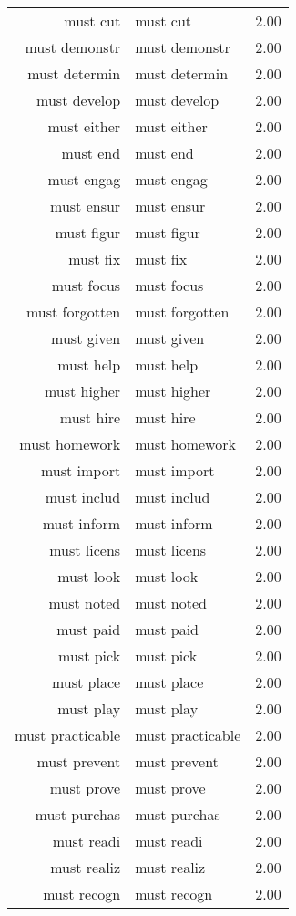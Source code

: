 \begin{table}[ht]
\begin{tabular}{rlr}
  must cut & must cut & 2.00 \\ 
  must demonstr & must demonstr & 2.00 \\ 
  must determin & must determin & 2.00 \\ 
  must develop & must develop & 2.00 \\ 
  must either & must either & 2.00 \\ 
  must end & must end & 2.00 \\ 
  must engag & must engag & 2.00 \\ 
  must ensur & must ensur & 2.00 \\ 
  must figur & must figur & 2.00 \\ 
  must fix & must fix & 2.00 \\ 
  must focus & must focus & 2.00 \\ 
  must forgotten & must forgotten & 2.00 \\ 
  must given & must given & 2.00 \\ 
  must help & must help & 2.00 \\ 
  must higher & must higher & 2.00 \\ 
  must hire & must hire & 2.00 \\ 
  must homework & must homework & 2.00 \\ 
  must import & must import & 2.00 \\ 
  must includ & must includ & 2.00 \\ 
  must inform & must inform & 2.00 \\ 
  must licens & must licens & 2.00 \\ 
  must look & must look & 2.00 \\ 
  must noted & must noted & 2.00 \\ 
  must paid & must paid & 2.00 \\ 
  must pick & must pick & 2.00 \\ 
  must place & must place & 2.00 \\ 
  must play & must play & 2.00 \\ 
  must practicable & must practicable & 2.00 \\ 
  must prevent & must prevent & 2.00 \\ 
  must prove & must prove & 2.00 \\ 
  must purchas & must purchas & 2.00 \\ 
  must readi & must readi & 2.00 \\ 
  must realiz & must realiz & 2.00 \\ 
  must recogn & must recogn & 2.00 \\ 

\end{tabular}
\end{table}

